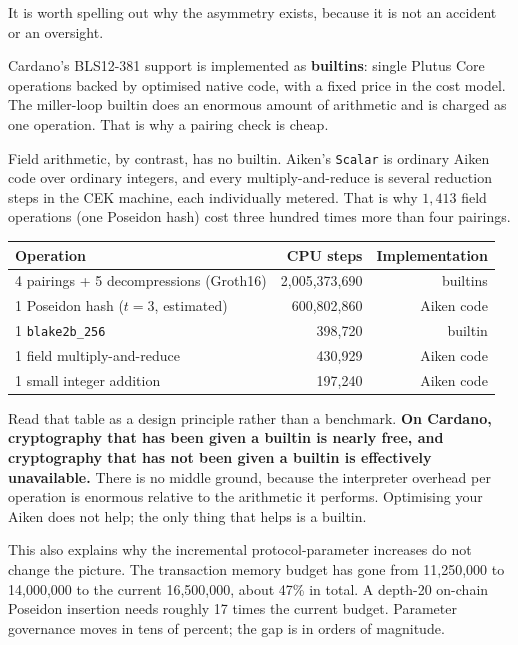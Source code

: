 It is worth spelling out why the asymmetry exists, because it is not an accident
or an oversight.

Cardano's BLS12-381 support is implemented as \textbf{builtins}: single Plutus
Core operations backed by optimised native code, with a fixed price in the cost
model. The miller-loop builtin does an enormous amount of arithmetic and is
charged as one operation. That is why a pairing check is cheap.

Field arithmetic, by contrast, has no builtin. Aiken's \texttt{Scalar} is
ordinary Aiken code over ordinary integers, and every multiply-and-reduce is
several reduction steps in the CEK machine, each individually metered. That is
why $1{,}413$ field operations (one Poseidon hash) cost three hundred times
more than four pairings.

\begin{center}
\begin{tabular}{lrr}
  \hline
  \textbf{Operation} & \textbf{CPU steps} & \textbf{Implementation} \\
  \hline
  4 pairings + 5 decompressions (Groth16) & 2{,}005{,}373{,}690 & builtins \\
  1 Poseidon hash ($t=3$, estimated)      &   600{,}802{,}860 & Aiken code \\
  1 \texttt{blake2b\_256}                 &       398{,}720 & builtin \\
  1 field multiply-and-reduce             &       430{,}929 & Aiken code \\
  1 small integer addition                &       197{,}240 & Aiken code \\
  \hline
\end{tabular}
\end{center}

Read that table as a design principle rather than a benchmark. \textbf{On
Cardano, cryptography that has been given a builtin is nearly free, and
cryptography that has not been given a builtin is effectively unavailable.}
There is no middle ground, because the interpreter overhead per operation is
enormous relative to the arithmetic it performs. Optimising your Aiken does not
help; the only thing that helps is a builtin.

This also explains why the incremental protocol-parameter increases do not
change the picture. The transaction memory budget has gone from 11{,}250{,}000
to 14{,}000{,}000 to the current 16{,}500{,}000, about 47\% in total. A
depth-20 on-chain Poseidon insertion needs roughly 17 times the current budget.
Parameter governance moves in tens of percent; the gap is in orders of
magnitude.

